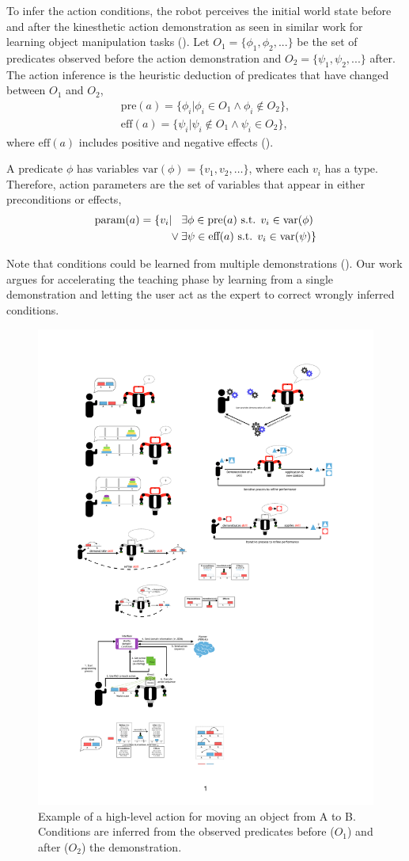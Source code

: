 To infer the action conditions, the robot perceives the initial world state   before %
and after the kinesthetic action demonstration as seen in similar work for learning object manipulation tasks (\cite{ahmadzadeh2015learning}).
Let $O_1 = \{\phi_1, \phi_2, ... \}$ be the set of predicates observed before the action demonstration and $O_2 = \{\psi_1, \psi_2, ... \}$ after.
The action inference is the heuristic deduction of predicates that have changed between $O_1$ and $O_2$, \ie
\begin{align*} \text{pre}(a) = \{\phi_i | \phi_i \in O_1 \wedge \phi_i \notin O_2 \}, \\
\text{eff}(a) = \{\psi_i | \psi_i \notin O_1 \wedge \psi_i \in O_2 \}, 
\end{align*}
where $\text{eff}(a)$ includes positive and negative effects ().

A predicate $\phi$ has variables $\text{var}(\phi) = \{v_1, v_2, \dots\}$, where each $v_i$ has a type.
Therefore, action parameters are the set of variables that appear in either preconditions or effects, \ie
\begin{align*}
     \text{param}(a) = \{v_i &| \hspace{0.3cm}\exists \phi \in \text{pre}(a) \text{ s.t. } v_i \in \text{var}(\phi)\\
     &\lor \exists \psi \in \text{eff}(a) \text{ s.t. } v_i \in \text{var}(\psi) \}
\end{align*}

Note that conditions could be learned from multiple demonstrations (\cite{abdo2013learning,konidaris2018fromSkills}).
Our work argues for accelerating the teaching phase by learning from a single demonstration and letting the user act as the expert to correct wrongly inferred conditions.

 
 \begin{figure}[h]
 	\centering
 	\includegraphics[width=0.5\linewidth]{figures/high-level.pdf}
 	\caption{Example of a high-level action for moving an object from A to B. Conditions are inferred from the observed predicates before ($O_1$) and after ($O_2$) the demonstration.
 	}
 	\label{fig:action-model}
 \end{figure}
 
